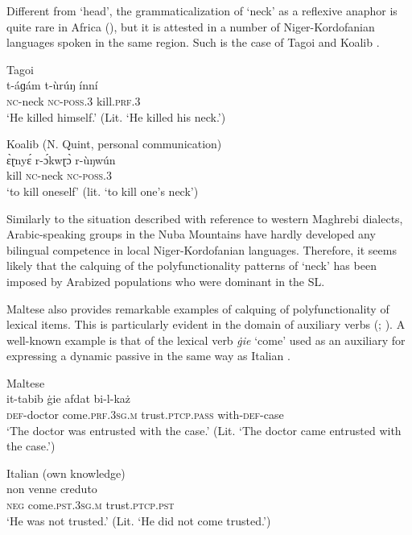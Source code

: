 \documentclass[output=paper]{langsci/langscibook}
\begin{document}
Different from ‘head’, the grammaticalization of ‘neck’ as a reflexive anaphor is quite rare in Africa (\citealt[50]{Heine2011}), but it is attested in a number of Niger-Kordofanian languages spoken in the same region. Such is the case of Tagoi  and Koalib . 

\ea\label{ex:key:21}
{Tagoi \citep[26]{Alamin2015}}\\
\gll   t-áɡám t-ùrúŋ ínní\\
       \textsc{nc}-neck \textsc{nc}-\textsc{poss.3} kill.\textsc{prf.3}\\
\glt   `He killed himself.' (Lit. ‘He killed his neck.’)
\z

\ea\label{ex:key:22}
{Koalib (N. Quint, personal communication)} \\
\gll   ɛ̀ɽnyɛ́ r-ɔ́kwɽɔ̀ r-ùŋwún\\
       kill \textsc{nc}-neck \textsc{nc-poss.3}\\
\glt   `to kill oneself' (lit. ‘to kill one's neck’)
\z

Similarly to the situation described with reference to western Maghrebi dialects, Arabic-speaking groups in the Nuba Mountains have hardly developed any bilingual competence in local Niger-Kordofanian languages. Therefore, it seems likely that the calquing of the polyfunctionality patterns of ‘neck’ has been imposed by Arabized populations who were dominant in the SL. 

Maltese also provides remarkable examples of calquing of polyfunctionality of lexical items. This is particularly evident in the domain of auxiliary verbs (\citealt{Vanhove1993}; \citealt{VanhoveCaubet2009}). A well-known example is that of the lexical verb \textit{\.gie} ‘come’ used as an auxiliary for expressing a dynamic passive  in the same way as Italian .

\ea\label{ex:key:23}
{Maltese \citep[214]{BorgAzzopardi-Alexander1997}}\\
\gll   it-tabib \.gie afdat bi-l-każ\\
       \textsc{def}-doctor come.\textsc{prf.3sg.m} trust.\textsc{ptcp.pass} with-\textsc{def}-case\\
\glt   `The doctor was entrusted with the case.' (Lit. ‘The doctor came entrusted with the case.’)
\z

\ea\label{ex:key:24}
{Italian (own knowledge)} \\
\gll   non venne creduto\\
       \textsc{neg} come.\textsc{pst.3sg.m} trust.\textsc{ptcp.pst}\\
\glt   `He was not trusted.' (Lit. ‘He did not come trusted.’)
\z
\end{document}
